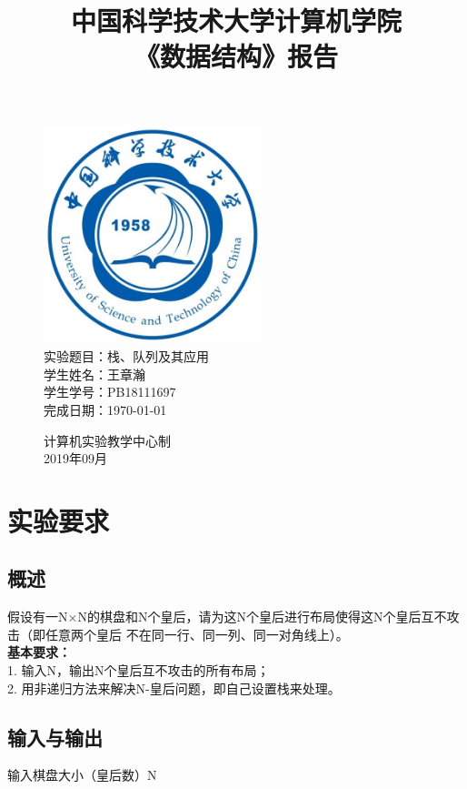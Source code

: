 \documentclass[UTF8]{article}
\title{中国科学技术大学计算机学院\\《数据结构》报告}
\author{}
\date{}
\begin{document}
\maketitle
	\begin{figure}[H]
		\centering
		\includegraphics[width=2.5in]{xiaohui.jpg}\vspace{0.5cm}\\
		\large{
			实验题目：栈、队列及其应用\\
			学生姓名：王章瀚\\
			学生学号：PB18111697\\
			完成日期：\today\\
		}\vspace{2cm}
		
		\large{计算机实验教学中心制\\2019年09月\\}
		\thispagestyle{empty}
		\clearpage  %
	\end{figure}
	\newpage
	
	\section{实验要求}
	\subsection{概述}
	假设有一N×N的棋盘和N个皇后，请为这N个皇后进行布局使得这N个皇后互不攻击（即任意两个皇后
	不在同一行、同一列、同一对角线上）。\\
	\textbf{基本要求：}\\
	1. 输入N，输出N个皇后互不攻击的所有布局；\\
	2. 用非递归方法来解决N-皇后问题，即自己设置栈来处理。\\
	
	\subsection{输入与输出}
	输入棋盘大小（皇后数）N\par
	
\end{document}
